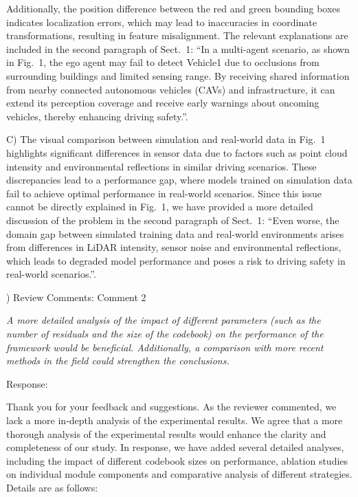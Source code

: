 \documentclass[12pt,a4paper]{article}
\begin{document}
Additionally, the position difference between the red and green bounding boxes indicates localization errors, which may lead to inaccuracies in coordinate transformations, resulting in feature misalignment. The relevant explanations are included in the second paragraph of Sect.~1:
``In a multi-agent scenario, as shown in Fig.~1, the ego agent may fail to detect Vehicle1 due to occlusions from surrounding buildings and limited sensing range. By receiving shared information from nearby connected autonomous vehicles (CAVs) and infrastructure, it can extend its perception coverage and receive early warnings about oncoming vehicles, thereby enhancing driving safety.''.

C) The visual comparison between simulation and real-world data in Fig.~1 highlights significant differences in sensor data due to factors such as point cloud intensity and environmental reflections in similar driving scenarios. These discrepancies lead to a performance gap, where models trained on simulation data fail to achieve optimal performance in real-world scenarios.
Since this issue cannot be directly explained in Fig.~1, we have provided a more detailed discussion of the problem in the second paragraph of Sect.~1: ``Even worse, the domain gap between simulated training data and real-world environments arises from differences in LiDAR intensity, sensor noise and environmental reflections, which leads to degraded model performance and poses a risk to driving safety in real-world scenarios.''.



\vspace{4ex}
) Review Comments: Comment 2

\textit{A more detailed analysis of the impact of different parameters (such as the number of residuals and the size of the codebook) on the performance of the framework would be beneficial. Additionally, a comparison with more recent methods in the field could strengthen the conclusions.}

\noindent Response:

Thank you for your feedback and suggestions. As the reviewer commented, we lack a more in-depth analysis of the experimental results. We agree that a more thorough analysis of the experimental results would enhance the clarity and completeness of our study. In response, we have added several detailed analyses, including the impact of different codebook sizes on performance, ablation studies on individual module components and comparative analysis of different strategies. 
Details are as follows:
\end{document}
